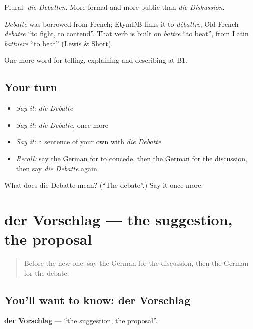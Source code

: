 Plural: \emph{die Debatten}. More formal and more public than \emph{die Diskussion}.

\begin{cousinweb}
\emph{Debatte} was borrowed from French; EtymDB links it to \emph{débattre}, Old French \emph{debatre} \textquotedblleft{}to fight, to contend\textquotedblright{}. That verb is built on \emph{battre} \textquotedblleft{}to beat\textquotedblright{}, from Latin \emph{battuere} \textquotedblleft{}to beat\textquotedblright{} (Lewis \& Short).
\end{cousinweb}

\begin{grammarlens}[title={What you've built}]
One more word for telling, explaining and describing at B1.
\end{grammarlens}

\subsection*{Your turn}
\begin{itemize}
\raggedright
  \item \emph{Say it:} \emph{die Debatte}
  \item \emph{Say it:} \emph{die Debatte}, once more
  \item \emph{Say it:} a sentence of your own with \emph{die Debatte}
  \item \emph{Recall:} say the German for to concede, then the German for the discussion, then say \emph{die Debatte} again
\end{itemize}

\begin{tcolorbox}[breakable,colback=teal!4,colframe=teal!35!black,title={Before you move on}]
What does die Debatte mean? (\textquotedblleft{}The debate\textquotedblright{}.) Say it once more.
\end{tcolorbox}
\section[der Vorschlag]{der Vorschlag — the suggestion, the proposal}

\label{lesson:GE-C335-vorschlag}



\begin{quote}
Before the new one: say the German for the discussion, then the German for the debate.
\end{quote}

\subsection*{You'll want to know: der Vorschlag}
\textbf{der Vorschlag} — \textquotedblleft{}the suggestion, the proposal\textquotedblright{}.

